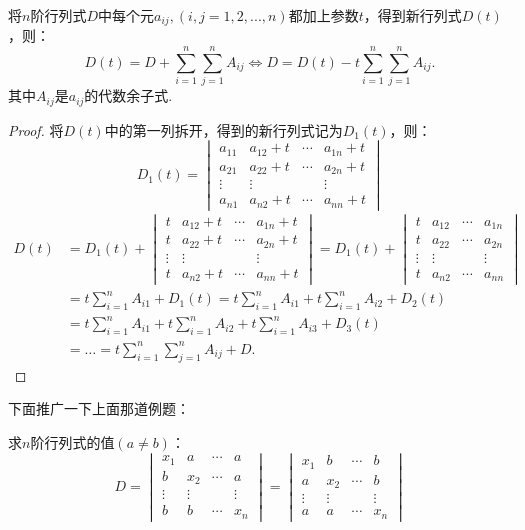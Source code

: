 \begin{theorem}{}{}
    将$n$阶行列式$D$中每个元$a_{ij},(i,j=1,2,...,n)$都加上参数$t$，得到新行列式$D(t)$，则：
    \[D(t)=D+\sum_{i=1}^n\sum_{j=1}^nA_{ij}\Leftrightarrow D=D(t)-t\sum_{i=1}^n\sum_{j=1}^nA_{ij}.\]
    其中$A_{ij}$是$a_{ij}$的代数余子式.
\end{theorem}
\begin{proof}{}{}
    将$D(t)$中的第一列拆开，得到的新行列式记为$D_1(t)$，则：
    \[D_1(t)=\begin{vmatrix}a_{11}&a_{12}+t&\cdots&a_{1n}+t\\
        a_{21}&a_{22}+t&\cdots&a_{2n}+t\\
        \vdots&\vdots&&\vdots\\
        a_{n1}&a_{n2}+t&\cdots&a_{nn}+t\end{vmatrix}\]
    \begin{align*}
        D(t)&=D_1(t)+\begin{vmatrix}t&a_{12}+t&\cdots&a_{1n}+t\\
        t&a_{22}+t&\cdots&a_{2n}+t\\\vdots&\vdots&&\vdots\\
        t&a_{n2}+t&\cdots&a_{nn}+t\end{vmatrix}
        =D_1(t)+
        \begin{vmatrix}t&a_{12}&\cdots&a_{1n}\\
            t&a_{22}&\cdots&a_{2n}\\
            \vdots&\vdots&&\vdots\\
            t&a_{n2}&\cdots&a_{nn}\end{vmatrix}\\
        &=t\sum_{i=1}^nA_{i1}+D_1(t)=t\sum_{i=1}^nA_{i1}+t\sum_{i=1}^nA_{i2}+D_2(t)\\
        &=t\sum_{i=1}^nA_{i1}+t\sum_{i=1}^nA_{i2}+t\sum_{i=1}^nA_{i3}+D_3(t)\\
        &=\dots=t\sum_{i=1}^{n}\sum_{j=1}^nA_{ij}+D.
        \end{align*}
\end{proof}
下面推广一下上面那道例题：
\begin{example}{}{}
    求$n$阶行列式的值$(a\ne b)$：
    \[D=\begin{vmatrix}x_1&a&\cdots&a\\b&x_2&\cdots&a\\
        \vdots&\vdots&&\vdots\\b&b&\cdots&x_n\end{vmatrix}=\begin{vmatrix}x_1&b&\cdots&b\\a&x_2&\cdots&b\\
        \vdots&\vdots&&\vdots\\a&a&\cdots&x_n\end{vmatrix}\]
\end{example}
